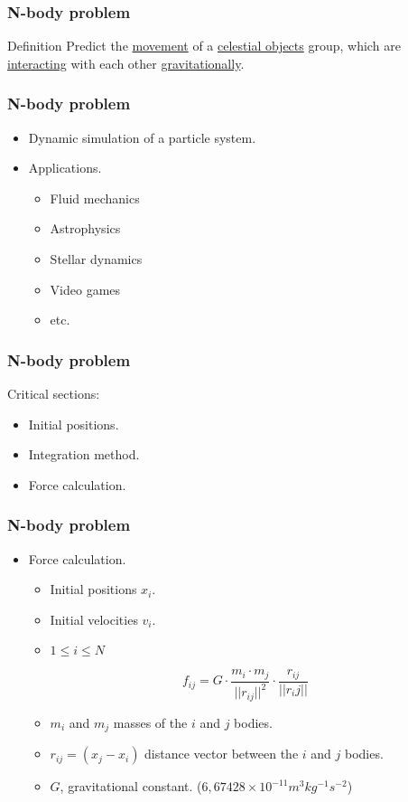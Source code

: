 \frame
{
\frametitle{N-body problem}
\begin{block}{Definition}
    Predict the \underline{movement} of a \underline{celestial objects} group,
    which are \underline{interacting} with each other \underline{gravitationally}.
\end{block}
}

\frame
{
\frametitle{N-body problem}
\begin{itemize}
    \item Dynamic simulation of a particle system.
    \item Applications.
    \begin{itemize}
        \item Fluid mechanics
        \item Astrophysics
        \item Stellar dynamics
        \item Video games
        \item etc.
    \end{itemize}
\end{itemize}
}


\frame
{
\frametitle{N-body problem}
Critical sections:
\begin{itemize}
    \item Initial positions.
    \item Integration method.
    \item Force calculation.
\end{itemize}
}


\frame
{
\frametitle{N-body problem}

\begin{itemize}
    \item Force calculation.
    \begin{itemize}
        \item Initial positions $x_i$.
        \item Initial velocities $v_i$.
        \item $1 \leq i \leq N$
    \end{itemize}
    $$f_{ij} =G \cdot \frac{m_i \cdot m_j}{||r_{ij}||^{2}} \cdot \frac{r_{ij}}{||r_ij||}$$
    \begin{itemize}
        \item $m_i$ and $m_j$ masses of the $i$ and $j$ bodies.
        \item $r_{ij} = (x_j - x_i )$ distance vector between the $i$ and $j$ bodies.
        \item $G$, gravitational constant. ($6,67428 \times 10^{-11} m^{3} kg^{-1} s^{-2}$)
    \end{itemize}
\end{itemize}
}
